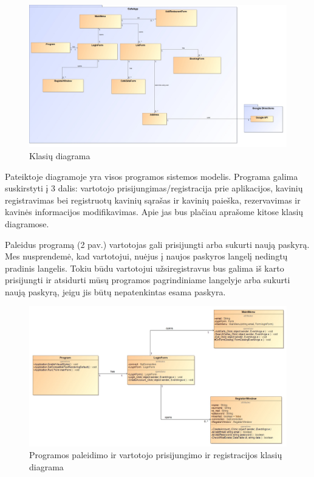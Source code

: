 \documentclass{VUMIFPSkursinis}
\begin{document}
\begin{figure}[H]
    \centering
    \includegraphics[width=\textwidth,height=\textheight,keepaspectratio]{img/Model} 
    \caption{Klasių diagrama}
    \label{img:Model}
\end{figure}
Pateiktoje diagramoje yra visos programos sistemos modelis. Programa galima suskirstyti į 3 dalis: vartotojo prisijungimas/registracija prie aplikacijos, kavinių registravimas bei registruotų kavinių sąrašas ir kavinių paieška, rezervavimas ir kavinės informacijos modifikavimas. Apie jas bus plačiau aprašome kitose klasių diagramose.
\pagebreak

Paleidus programą (2 pav.) vartotojas gali prisijungti arba sukurti naują paskyrą. Mes nusprendemė, kad vartotojui, nuėjus į naujos paskyros langelį nedingtų pradinis langelis. Tokiu būdu vartotojui užsiregistravus bus galima iš karto prisijungti ir atsidurti mūsų programos pagrindiniame langelyje arba sukurti naują paskyrą, jeigu jis būtų nepatenkintas esama paskyra. 
\newline
\newline
\newline
\newline
\newline
\newline
\begin{figure}[H]
    \centering
    \includegraphics[width=\textwidth,height=\textheight,keepaspectratio]{img/Program_LoginForm_Register_MainMenu} 
    \caption{Programos paleidimo ir vartotojo prisijungimo ir registracijos  klasių diagrama}
    \label{img:Program_LoginForm_Register_MainMenu}
\end{figure}
\end{document}

